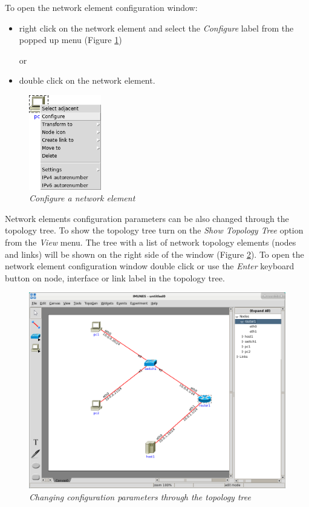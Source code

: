 To open the network element configuration window:
\begin{itemize}
  \item right click on the network element and select the \emph{Configure}
label from the popped up menu (Figure \ref{fig:configure_label}) 
  
  or
  
  \item double click on the network element.
\end{itemize}

\begin{figure}[H]
\centering
\vspace{10pt}
\includegraphics[width=0.28\textwidth]{./images/configure_label.png}
\caption{\emph{Configure a network element}}
\label{fig:configure_label}
\end{figure}

Network elements configuration parameters can be also changed through the
topology tree. To show the topology tree turn on the \emph{Show Topology Tree}
option from the \emph{View} menu. The tree with a list of network topology
elements (nodes and links) will be shown on the right side of the window
(Figure \ref{fig:topology_tree}). To open the network element configuration
window double click or use the \emph{Enter} keyboard button on node, interface
or link label in the topology tree.

\begin{figure}[H]
\centering
\vspace{10pt}
\includegraphics[width=\textwidth]{./images/topology_tree.png}
\caption{\emph{Changing configuration parameters through the topology tree}}
\label{fig:topology_tree}
\end{figure}

